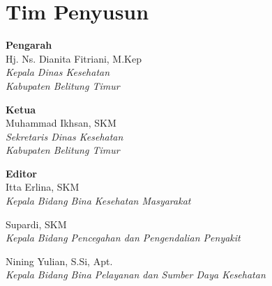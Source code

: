 {}

\section*{Tim Penyusun}
{\parindent0pt
\textbf{Pengarah}\\
\smallskip
Hj. Ns. Dianita Fitriani, M.Kep\\
\emph{Kepala Dinas Kesehatan\\Kabupaten Belitung Timur}
\bigskip{}

\textbf{Ketua}\\
\smallskip
Muhammad Ikhsan, SKM\\
\emph{Sekretaris Dinas Kesehatan \\Kabupaten Belitung Timur}
\bigskip{}


\textbf{Editor}\\
\smallskip
Itta Erlina, SKM\\
\emph{Kepala Bidang Bina Kesehatan Masyarakat}
\smallskip

Supardi, SKM\\
\emph{Kepala Bidang Pencegahan dan Pengendalian Penyakit}
\smallskip

Nining Yulian, S.Si, Apt.\\
\emph{Kepala Bidang Bina Pelayanan dan Sumber Daya Kesehatan}
\bigskip

}

